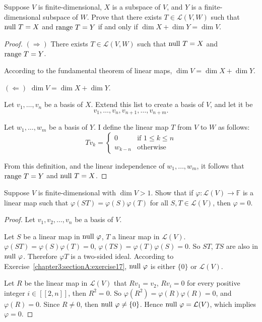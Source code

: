 \begin{exercise}
    Suppose $V$ is finite-dimensional, $X$ is a subspace of $V$, and $Y$ is a finite-dimensional subspace of $W$. Prove that there exists $T \in \mathcal{L}(V, W)$ such that $\operatorname{null}\,{T} = X$ and $\operatorname{range}\,{T} = Y$ if and only if $\dim X + \dim Y = \dim V$.
\end{exercise}

\begin{proof}
    $(\Rightarrow)$ There exists $T \in \mathcal{L}(V, W)$ such that $\operatorname{null}\,{T} = X$ and $\operatorname{range}\,{T} = Y$.

    According to the fundamental theorem of linear maps, $\dim V = \dim X + \dim Y$.

    $(\Leftarrow)$ $\dim V = \dim X + \dim Y$.

    Let $v_{1}, \ldots, v_{n}$ be a basis of $X$. Extend this list to create a basis of $V$, and let it be
    \[
        v_{1}, \ldots, v_{n}, v_{n+1}, \ldots, v_{n+m}.
    \]

    Let $w_{1}, \ldots, w_{m}$ be a basis of $Y$. I define the linear map $T$ from $V$ to $W$ as follows:
    \[
        Tv_{k} = \begin{cases}
            0       & \text{if $1\leq k\leq n$} \\
            w_{k-n} & \text{otherwise}
        \end{cases}
    \]

    From this definition, and the linear independence of $w_{1}, \ldots, w_{m}$, it follows that $\operatorname{range}\,{T} = Y$ and $\operatorname{null}\,{T} = X$.
\end{proof}
\newpage

\begin{exercise}
    Suppose $V$ is finite-dimensional with $\dim V > 1$. Show that if $\varphi: \mathcal{L}(V) \to \mathbb{F}$ is a linear map such that $\varphi(ST) = \varphi(S)\varphi(T)$ for all $S, T \in \mathcal{L}(V)$, then $\varphi = 0$.
\end{exercise}

\begin{proof}
    Let $v_{1}, v_{2}, \ldots, v_{n}$ be a basis of $V$.

    Let $S$ be a linear map in $\operatorname{null}\,{\varphi}$, $T$ a linear map in $\mathcal{L}(V)$. $\varphi(ST) = \varphi(S)\varphi(T) = 0$, $\varphi(TS) = \varphi(T)\varphi(S) = 0$. So $ST$, $TS$ are also in $\operatorname{null}\,{\varphi}$. Therefore $\varphi{T}$ is a two-sided ideal. According to Exercise~\ref{chapter3:sectionA:exercise17}, $\operatorname{null}\,{\varphi}$ is either $\{0\}$ or $\mathcal{L}(V)$.

    Let $R$ be the linear map in $\mathcal{L}(V)$ that $Rv_{1} = v_{2}$, $Rv_{i} = 0$ for every positive integer $i\in[\![ 2, n ]\!]$, then $R^{2} = 0$. So $\varphi(R^{2}) = \varphi(R)\varphi(R) = 0$, and $\varphi(R) = 0$. Since $R\ne 0$, then $\operatorname{null}\,{\varphi}\ne \{0\}$. Hence $\operatorname{null}\,{\varphi} = \mathcal{L}(V)$, which implies $\varphi = 0$.
\end{proof}
\newpage

